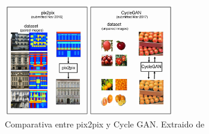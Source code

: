\documentclass[../main.tex]{subfiles}
\begin{document}
\begin{figure}[h]
    \centering
    \includegraphics[width=0.66\textwidth]{imagenes/pix2pix y cyclegan.png}
    \caption[Comparativa entre pix2pix y Cycle GAN]{Comparativa entre pix2pix y Cycle GAN. Extraido de \cite{Foster2019}}
    \label{fig:pix2pixVScycleGAN}
\end{figure}
\newpage
\end{document}
